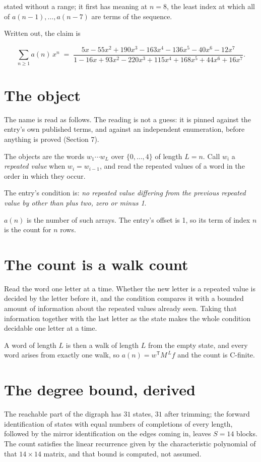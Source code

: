 \documentclass[11pt]{article}
\theoremstyle{definition}
\begin{document}
stated without a range; it first has meaning at $n = 8$, the least index at which all of $a(n-1),\dots,a(n-7)$ are terms of the sequence.

Written out, the claim is

\[\sum_{n \ge 1} a(n)\,x^n \;=\; \frac{5x - 55x^{2} + 190x^{3} - 163x^{4} - 136x^{5} - 40x^{6} - 12x^{7}}{1 - 16x + 93x^{2} - 220x^{3} + 115x^{4} + 168x^{5} + 44x^{6} + 16x^{7}}.\]

\section{The object}

The name is read as follows. The reading is not a guess: it is pinned against the entry's own published terms, and against an independent enumeration, before anything is proved (Section 7).

The objects are the words $w_1\cdots w_L$ over $\{0,\dots,4\}$ of length $L = n$. Call $w_i$ a {\itshape repeated value} when $w_i = w_{i-1}$, and read the repeated values of a word in the order in which they occur.

The entry's condition is: {\itshape no repeated value differing from the previous repeated value by other than plus two, zero or minus 1}.

$a(n)$ is the number of such arrays. The entry's offset is 1, so its term of index $n$ is the count for $n$ rows.

\section{The count is a walk count}

Read the word one letter at a time. Whether the new letter is a repeated value is decided by the letter before it, and the condition compares it with a bounded amount of information about the repeated values already seen. Taking that information together with the last letter as the state makes the whole condition decidable one letter at a time.

A word of length $L$ is then a walk of length $L$ from the empty state, and every word arises from exactly one walk, so $a(n) = w^{\mathsf T}M^{\,L}f$ and the count is C-finite.

\section{The degree bound, derived}

The reachable part of the digraph has $31$ states, $31$ after trimming; the forward identification of states with equal numbers of completions of every length, followed by the mirror identification on the edges coming in, leaves $S = 14$ blocks. The count satisfies the linear recurrence given by the characteristic polynomial of that $14\times14$ matrix, and that bound is computed, not assumed.
\end{document}
